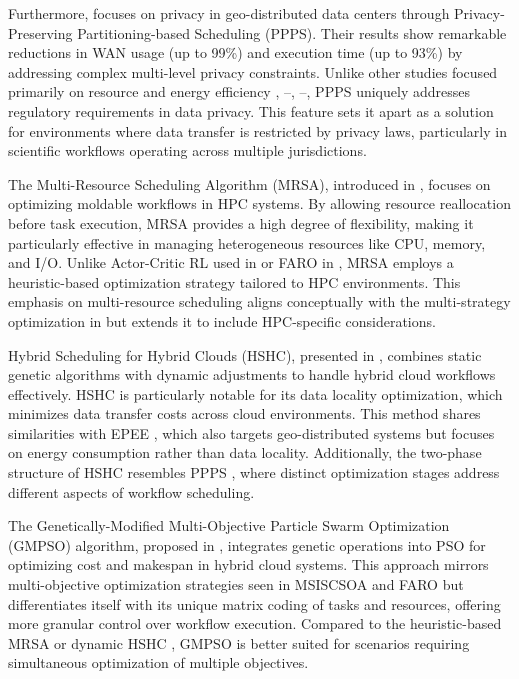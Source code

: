 \documentclass[a4paper, final]{article}
\begin{document}
Furthermore, \cite{bib:7_ppps} focuses on privacy in geo-distributed data centers through Privacy-Preserving 
Partitioning-based Scheduling (PPPS). Their results show remarkable reductions in WAN usage (up to 99\%) 
and execution time (up to 93\%) by addressing complex multi-level privacy constraints. Unlike other studies 
focused primarily on resource and energy efficiency \cite{bib:1_acrl}, 
\cite{bib:3_sandcat}--\cite{bib:6_marine}, \cite{bib:8}--\cite{bib:10}, PPPS uniquely addresses regulatory 
requirements in data privacy. This feature sets it apart as a solution for environments where data transfer 
is restricted by privacy laws, particularly in scientific workflows operating across multiple jurisdictions.

The Multi-Resource Scheduling Algorithm (MRSA), introduced in \cite{bib:8}, focuses on optimizing moldable 
workflows in HPC systems. By allowing resource reallocation before task execution, MRSA provides a high degree 
of flexibility, making it particularly effective in managing heterogeneous resources like CPU, memory, 
and I/O. Unlike Actor-Critic RL used in \cite{bib:1_acrl} or FARO in \cite{bib:2_faro}, MRSA employs a 
heuristic-based optimization strategy tailored to HPC environments. This emphasis on multi-resource 
scheduling aligns conceptually with the multi-strategy optimization in \cite{bib:3_sandcat} but extends it 
to include HPC-specific considerations.

Hybrid Scheduling for Hybrid Clouds (HSHC), presented in \cite{bib:9}, combines static genetic algorithms 
with dynamic adjustments to handle hybrid cloud workflows effectively. HSHC is particularly notable for its 
data locality optimization, which minimizes data transfer costs across cloud environments. This method 
shares similarities with EPEE \cite{bib:5_epee}, which also targets geo-distributed systems but focuses 
on energy consumption rather than data locality. Additionally, the two-phase structure of HSHC resembles 
PPPS \cite{bib:7_ppps}, where distinct optimization stages address different aspects of workflow scheduling.

The Genetically-Modified Multi-Objective Particle Swarm Optimization (GMPSO) algorithm, proposed in 
\cite{bib:10}, integrates genetic operations into PSO for optimizing cost and makespan in hybrid cloud 
systems. This approach mirrors multi-objective optimization strategies seen in MSISCSOA \cite{bib:3_sandcat} 
and FARO \cite{bib:2_faro} but differentiates itself with its unique matrix coding of tasks and resources, 
offering more granular control over workflow execution. Compared to the heuristic-based MRSA \cite{bib:8} 
or dynamic HSHC \cite{bib:9}, GMPSO is better suited for scenarios requiring simultaneous optimization of 
multiple objectives.
\end{document}
